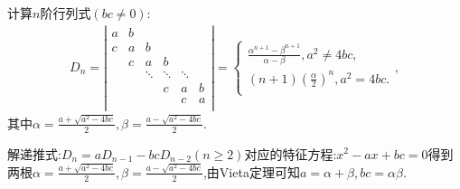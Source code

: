 \documentclass[../../main.tex]{subfiles}
\begin{document}
\begin{corollary}\label{corollary:对角线元素相同的三对角行列式}
计算$n$阶行列式$(bc\ne0)$:
\begin{equation}
\begin{split}
D_n=\left| \begin{matrix}
a&		b&		&		&		&		\\
c&		a&		b&		&		&		\\
&		c&		a&		b&		&		\\
&		&		\ddots&		\ddots&		\ddots&		\\
&		&		&		c&		a&		b\\
&		&		&		&		c&		a\\
\end{matrix} \right|=\begin{cases}
\frac{\alpha ^{n+1}-\beta ^{n+1}}{\alpha -\beta},a^2\ne 4bc,\\
\left( n+1 \right) \left( \frac{\alpha}{2} \right) ^n,a^2=4bc.\\
\end{cases},
\end{split}
\nonumber
\end{equation}
其中$\alpha =\frac{a+\sqrt{a^2-4bc}}{2},\beta =\frac{a-\sqrt{a^2-4bc}}{2}$.
\end{corollary}
\begin{note}
解递推式:$D_n=aD_{n-1}-bcD_{n-2}(n\ge2)$对应的特征方程:$x^2-ax+bc=0$得到两根$\alpha =\frac{a+\sqrt{a^2-4bc}}{2},\beta =\frac{a-\sqrt{a^2-4bc}}{2}$,由Vieta定理可知$a=\alpha+\beta,bc=\alpha\beta$.
\end{note}
\end{document}
